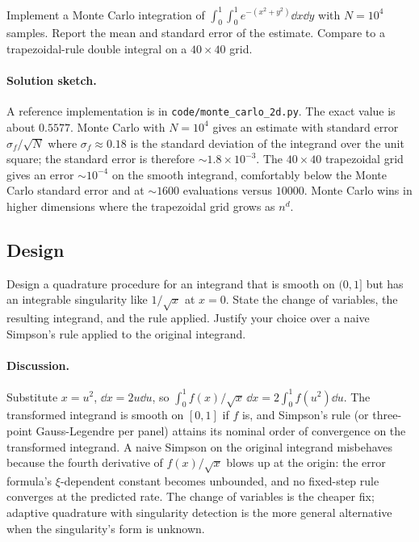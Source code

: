 \begin{exercise}
Implement a Monte Carlo integration of $\int_{0}^{1}\int_{0}^{1}
e^{-(x^{2} + y^{2})} \dd x \dd y$ with $N = 10^{4}$ samples. Report
the mean and standard error of the estimate. Compare to a
trapezoidal-rule double integral on a $40 \times 40$ grid.
\end{exercise}

\paragraph{Solution sketch.}
A reference implementation is in
\texttt{code/monte\_carlo\_2d.py}. The exact value is about
$0.5577$. Monte Carlo with $N = 10^{4}$ gives an estimate with
standard error $\sigma_{f}/\sqrt{N}$ where $\sigma_{f} \approx
0.18$ is the standard deviation of the integrand over the unit
square; the standard error is therefore $\sim 1.8 \times 10^{-3}$.
The $40 \times 40$ trapezoidal grid gives an error $\sim 10^{-4}$
on the smooth integrand, comfortably below the Monte Carlo
standard error and at $\sim 1600$ evaluations versus $10000$.
Monte Carlo wins in higher dimensions where the trapezoidal grid
grows as $n^{d}$.

\subsection*{Design}

\begin{exercise}
Design a quadrature procedure for an integrand that is smooth on
$(0, 1]$ but has an integrable singularity like $1/\sqrt{x}$ at
$x = 0$. State the change of variables, the resulting integrand,
and the rule applied. Justify your choice over a naive Simpson's
rule applied to the original integrand.
\end{exercise}

\paragraph{Discussion.}
Substitute $x = u^{2}$, $\dd x = 2 u \dd u$, so $\int_{0}^{1}
f(x)/\sqrt{x}\,\dd x = 2 \int_{0}^{1} f(u^{2}) \dd u$. The
transformed integrand is smooth on $[0, 1]$ if $f$ is, and
Simpson's rule (or three-point Gauss-Legendre per panel) attains
its nominal order of convergence on the transformed integrand. A
naive Simpson on the original integrand misbehaves because the
fourth derivative of $f(x)/\sqrt{x}$ blows up at the origin: the
error formula's $\xi$-dependent constant becomes unbounded, and
no fixed-step rule converges at the predicted rate. The change of
variables is the cheaper fix; adaptive quadrature with
singularity detection is the more general alternative when the
singularity's form is unknown.

